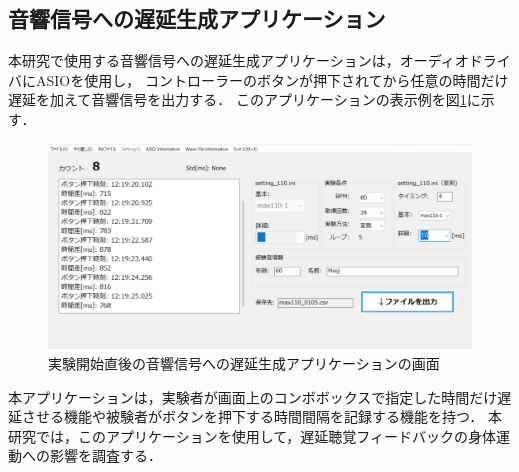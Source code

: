 \subsection{音響信号への遅延生成アプリケーション}
本研究で使用する音響信号への遅延生成アプリケーションは，オーディオドライバにASIOを使用し，
コントローラーのボタンが押下されてから任意の時間だけ遅延を加えて音響信号を出力する．
このアプリケーションの表示例を図\ref{fig:app_kyakkann}に示す．
\begin{figure}[tbp]
  \centering
  \includegraphics[scale=0.22]{figures/Apprication/App_kyakkann.pdf}
  \caption{実験開始直後の音響信号への遅延生成アプリケーションの画面}
  \label{fig:app_kyakkann}
\end{figure}
本アプリケーションは，実験者が画面上のコンボボックスで指定した時間だけ遅延させる機能や被験者がボタンを押下する時間間隔を記録する機能を持つ．
本研究では，このアプリケーションを使用して，遅延聴覚フィードバックの身体運動への影響を調査する．